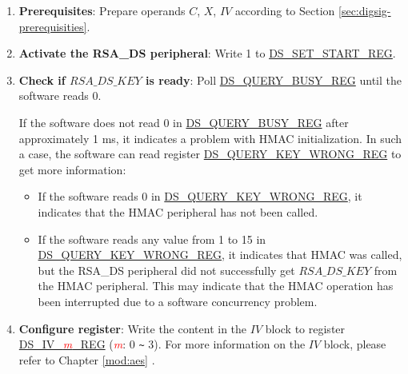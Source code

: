 \documentclass[main\_\_EN.tex]{subfiles}
\begin{document}
\begin{enumerate}

    \item {\bfseries Prerequisites}: Prepare operands \begin{math}C\end{math}, \begin{math}X\end{math}, \begin{math}IV\end{math} according to Section \ref{sec:digsig-prerequisities}.

    \item {\bfseries Activate the RSA\_DS peripheral}: Write 1 to \hyperref[regdesc:DSSETSTARTREG]{DS\_SET\_START\_REG}.

    \item {\bfseries Check if \begin{math}RSA\_DS\_KEY\end{math} is ready}: Poll \hyperref[regdesc:DSQUERYBUSYREG]{DS\_QUERY\_BUSY\_REG} until the software reads 0.

    If the software does not read 0 in \hyperref[regdesc:DSQUERYBUSYREG]{DS\_QUERY\_BUSY\_REG} after approximately 1 ms, it indicates a problem with HMAC initialization. In such a case, the software can read register \hyperref[regdesc:DSQUERYKEYWRONGREG]{DS\_QUERY\_KEY\_WRONG\_REG} to get more information:

    \begin{itemize}

        \item If the software reads 0 in \hyperref[regdesc:DSQUERYKEYWRONGREG]{DS\_QUERY\_KEY\_WRONG\_REG}, it indicates that the HMAC peripheral has not been called.

        \item If the software reads any value from 1 to 15 in \hyperref[regdesc:DSQUERYKEYWRONGREG]{DS\_QUERY\_KEY\_WRONG\_REG}, it indicates that HMAC was called, but the RSA\_DS peripheral did not successfully get \begin{math}RSA\_DS\_KEY\end{math} from the HMAC peripheral. This may indicate that the HMAC operation has been interrupted due to a software concurrency problem.

    \end{itemize}

    \item {\bfseries Configure register}: Write the content in the \begin{math}IV\end{math} block to register \hyperref[regdesc:DSIVREG]{DS\_IV\_\textcolor{red}{\it{m}}\_REG} (\textcolor{red}{\it{m}}: 0 \verb+~+ 3). For more information on the \begin{math}IV\end{math} block, please refer to Chapter \ref{mod:aes} \textit{}.


\end{enumerate}
\end{document}
